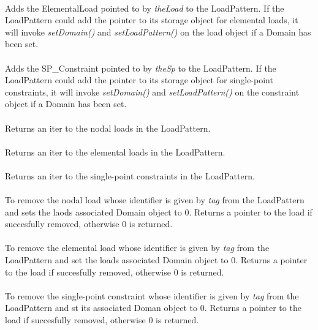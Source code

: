 \\
Adds the ElementalLoad pointed to by {\em theLoad} to the
LoadPattern. If the LoadPattern could add the pointer to its storage
object for elemental loads, it will invoke {\em setDomain()}
and {\em setLoadPattern()} on the load object if a Domain has been set. \\

\\ 
Adds the SP\_Constraint pointed to by {\em theSp} to the
LoadPattern. If the LoadPattern could add the pointer to its storage
object for single-point constraints, it will invoke {\em setDomain()}
and {\em setLoadPattern()} on the constraint object if a Domain has
been set. \\

\\
Returns an iter to the nodal loads in the LoadPattern. \\

\\
Returns an iter to the elemental loads in the LoadPattern. \\

\\ 
Returns an iter to the single-point constraints in the LoadPattern. \\
    
\\
To remove the nodal load whose identifier is given by {\em tag} from
the LoadPattern and sets the laods associated Domain object to
$0$. Returns a pointer to the load if succesfully removed, otherwise
$0$ is returned. \\ 

\\
To remove the elemental load whose identifier is given by {\em tag} from
the LoadPattern and set the loads associated Domain object to
$0$. Returns a pointer to the load if succesfully removed, otherwise
$0$ is returned. \\ 

\\ 
To remove the single-point constraint whose identifier is given by {\em tag} from
the LoadPattern and st its associated Doman object to $0$. Returns a
pointer to the load if succesfully removed, otherwise $0$ is
returned. \\ 

